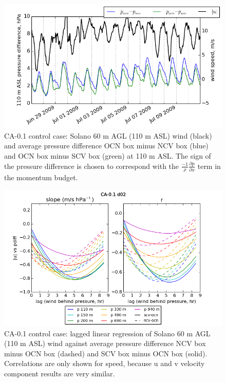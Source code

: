 \begin{figure}[here]
\includegraphics[width=1\textwidth]{ch3-wind/img/pgrad_wind_CA0pt1_level110.png}
\caption{CA-0.1 control case: Solano 60 m AGL (110 m ASL) wind (black) and average pressure difference OCN box minus NCV box (blue) and OCN box minus SCV box (green) at 110 m ASL.  The sign of the pressure difference is chosen to correspond with the $\frac{-1}{\rho} \frac{\partial p}{\partial x}$ term in the momentum budget.}
\label{fig:windSol_PgradWind}
\end{figure}

\begin{figure}[here]
\includegraphics[width=1\textwidth]{ch3-wind/img/lag_corr_pdiff_combo_ncv_scv_d02_CA0pt1.png}
\caption{CA-0.1 control case: lagged linear regression of Solano 60 m AGL (110 m ASL) wind against average pressure difference NCV box minus OCN box (dashed) and SCV box minus OCN box (solid).  Correlations are only shown for speed, because u and v velocity component results are very similar.}
\label{fig:windSol_LagCorrCtrl}
\end{figure}

